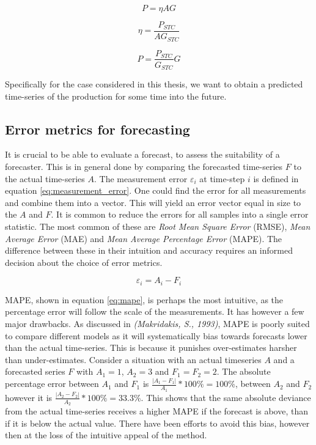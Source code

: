 \begin{equation}
    P = \eta A G
    \label{eq:pv_power_simple}
\end{equation}

\begin{equation}
    \eta =  \frac{P_{STC}}{A G_{STC}}
    \label{eq:pv_efficency}
\end{equation}

\begin{equation}
    P = \frac{P_{STC}}{G_{STC}} G
    \label{eq:pv_power_full}
\end{equation}


Specifically for the case considered in this thesis, we want to obtain a predicted time-series of the production for some time into the future. 

\subsection{Error metrics for forecasting}
It is crucial to be able to evaluate a forecast, to assess the suitability of a forecaster. This is in general done by comparing the forecasted time-series $F$ to the actual time-series $A$. The measurement error $\varepsilon_i$ at time-step $i$ is defined in equation \ref{eq:measurement_error}. One could find the error for all measurements and combine them into a vector. This will yield an error vector equal in size to the $A$ and $F$. It is common to reduce the errors for all samples into a single error statistic. The most common of these are \textit{Root Mean Square Error} (RMSE), \textit{Mean Average Error} (MAE) and \textit{Mean Average Percentage Error} (MAPE). The difference between these in their intuition and accuracy requires an informed decision about the choice of error metrics.

\begin{equation}
    \varepsilon_i = A_i - F_i
    \label{eq:measurement_error}
\end{equation}

MAPE, shown in equation \ref{eq:mape}, is perhaps the most intuitive, as the percentage error will follow the scale of the measurements. It has however a few major drawbacks.\cite{MAKRIDAKIS1993527} As discussed in \textit{(Makridakis, S., 1993)}, MAPE is poorly suited to compare different models as it will systematically bias towards forecasts lower than the actual time-series. This is because it punishes over-estimates harsher than under-estimates. Consider a situation with an actual timeseries $A$ and a forecasted series $F$ with $A_1 = 1$, $A_2 = 3$ and $F_1 = F_2 = 2$. The absolute percentage error between $A_1$ and $F_1$ is $\frac{|A_1-F_1|}{A_1}*100\%=100\%$, between $A_2$ and $F_2$ however it is $\frac{|A_2-F_2|}{A_2}*100\%=33.3\%$\cite{kolassa2011}. This shows that the same absolute deviance from the actual time-series receives a higher MAPE if the forecast is above, than if it is below the actual value. There have been efforts to avoid this bias, however then at the loss of the intuitive appeal of the method.\\

